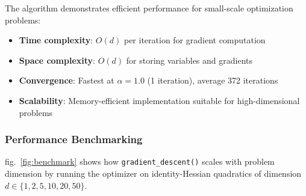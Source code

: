 \documentclass[
]{article}
\providecommand{\tightlist}{%
  \setlength{\itemsep}{0pt}\setlength{\parskip}{0pt}}
\begin{document}
The algorithm demonstrates efficient performance for small-scale
optimization problems:

\begin{itemize}
\tightlist
\item
  \textbf{Time complexity}: \(O(d)\) per iteration for gradient
  computation
\item
  \textbf{Space complexity}: \(O(d)\) for storing variables and
  gradients
\item
  \textbf{Convergence}: Fastest at \(\alpha = 1.0\) (1 iteration),
  average 372 iterations
\item
  \textbf{Scalability}: Memory-efficient implementation suitable for
  high-dimensional problems
\end{itemize}

\subsubsection{Performance
Benchmarking}\label{performance-benchmarking-1}

fig.~\ref{fig:benchmark} shows how \texttt{gradient\_descent()} scales
with problem dimension by running the optimizer on identity-Hessian
quadratics of dimension \(d \in \{1, 2, 5, 10, 20, 50\}\).
\end{document}
